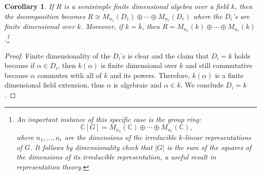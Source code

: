 \documentclass{tufte-handout} %
\newtheorem{cor}[thm]{Corollary}
\theoremstyle{definition}
\theoremstyle{remark}
\renewcommand{\C}{\mathbb{C}}
\begin{document}
\begin{cor}\label{cordivalgclosed}
	If $R$ is a semisimple finite dimensional algebra over a field $k$, then the decomposition becomes $R \cong M_{n_1}(D_1) \oplus \cdots \oplus M_{n_r}(D_r)$ where the $D_i$'s are finite dimensional over $k$. Moreover, if $k = \bar{k}$, then $R = M_{n_1}(k) \oplus \cdots \oplus M_{n_r}(k)$.\footnote{An important instance of this specific case is the group ring: \[\C[G] = M_{n_1}(\C) \oplus \cdots \oplus M_{n_r}(\C),\] where $n_1, \dots, n_r$ are the dimensions of the irreducible $k$-linear representations of $G$. It follows by dimensionality check that $|G|$ is the sum of the squares of the dimensions of its irreducible representation, a useful result in representation theory.}
\end{cor}
\begin{proof}
	Finite dimensionality of the $D_i$'s is clear and the claim that $D_i = k$ holds because if $\alpha \in D_i$, then $k(\alpha)$ is finite dimensional over $k$ and still commutative because $\alpha$ commutes with all of $k$ and its powers. Therefore, $k(\alpha)$ is a finite dimensional field extension, thus $\alpha$ is algebraic and $\alpha \in k$. We conclude $D_i = k$.
\end{proof}
\end{document}
